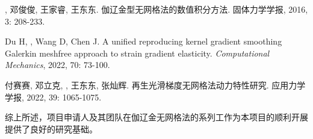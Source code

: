 \begin{thebibliography}{1}
	, 邓俊俊, 王家睿, 王东东.
	\newblock 伽辽金型无网格法的数值积分方法.
	\newblock 固体力学学报, 2016, 3: 208-233.

	Du H, , Wang D, Chen J.
	\newblock A unified reproducing kernel gradient smoothing {{Galerkin}} meshfree
	  approach to strain gradient elasticity.
	\newblock \emph{Computational Mechanics}, 2022, 70: 73-100.

	付赛赛, 邓立克, , 王东东, 张灿辉.
	\newblock 再生光滑梯度无网格法动力特性研究.
	\newblock 应用力学学报, 2022, 39: 1065-1075.

\end{thebibliography}

综上所述，项目申请人及其团队在伽辽金无网格法的系列工作为本项目的顺利开展提供了良好的研究基础。

